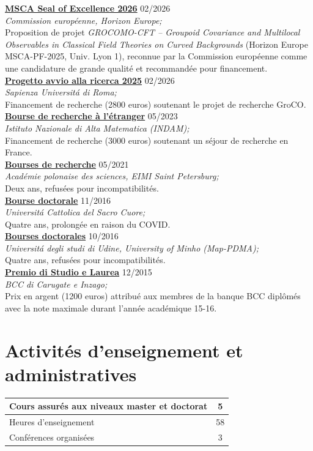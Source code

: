 \documentclass[a4paper]{article}
\newcommand{\voice}[5]{\href{#4}{\textbf{#1}} \hfill #2 \\ \textit{#3} \\ {\small #5} \vspace{0.2cm} \\}
\begin{document}
    \voice{MSCA Seal of Excellence 2026}
        {02/2026}
        {Commission européenne, Horizon Europe;}
        {https://www.dropbox.com/scl/fi/zr05hlqz8rpq4d9j51b7q/2602-MSCA-SealofExcellence.pdf?rlkey=ovu5ad8hmdjh9nkaqy8rmq3lb&st=wbag5jwb&dl=0}
        {Proposition de projet \emph{GROCOMO-CFT – Groupoid Covariance and Multilocal Observables in Classical Field Theories on Curved Backgrounds} (Horizon Europe MSCA-PF-2025, Univ. Lyon 1), reconnue par la Commission européenne comme une candidature de grande qualité et recommandée pour financement.}
    \voice{Progetto avvio alla ricerca 2025}
        {02/2026}
        {Sapienza Universit\'a di Roma;}
        {https://www.dropbox.com/scl/fi/sgragjrgzdtfesdmhm4bv/2602-AvvioRicerca-Grant.pdf?rlkey=6iplpssiva66zkdw7qna4wl0c&st=x8jty2x7&dl=0}
        {Financement de recherche (2800 euros) soutenant le projet de recherche GroCO.}
	\voice{Bourse de recherche à l'étranger}
		{05/2023}
		{Istituto Nazionale di Alta Matematica (INDAM);}
		{https://www.altamatematica.it/wp-content/uploads/2022/12/bando-estero-2022-2023-1.pdf}
		{Financement de recherche (3000 euros) soutenant un séjour de recherche en France.}
	\voice{Bourses de recherche}
		{05/2021}
		{Académie polonaise des sciences, EIMI Saint Petersburg;}
		{}
		{Deux ans, refusées pour incompatibilités.}
	\voice{Bourse doctorale}
		{11/2016}
		{Universit\'a Cattolica del Sacro Cuore;}
		{https://www.dropbox.com/s/pmsg20xsxd6x5yf/External_Scholarship.pdf?dl=0}
		{Quatre ans, prolongée en raison du COVID.}
	\voice{Bourses doctorales}
		{10/2016}
		{Universit\'a degli studi di Udine, University of Minho (Map-PDMA);}
		{}
		{Quatre ans, refusées pour incompatibilités.}
	\voice{Premio di Studio e Laurea}
		{12/2015}
		{BCC di Carugate e Inzago;}
		{https://web.archive.org/web/20191207203437/https://www.bccmilano.it/news/dettaglio_news_div.asp?i_menuID=54872&hNewsID=132411}
		{Prix en argent (1200 euros) attribué aux membres de la banque BCC diplômés avec la note maximale durant l'année académique 15-16.}

	\clearpage
	\section*{Activités d'enseignement et administratives}

		\begin{center}
	\begin{tabularx}{.5\linewidth}{|X|c|}
	\hline

	Cours assurés aux niveaux master et doctorat & 5 \\
	\hline

	Heures d'enseignement & 58 \\
	\hline

	Conférences organisées & 3 \\
	\hline

	\end{tabularx}
		\end{center}
	\vspace{1em}
\end{document}
